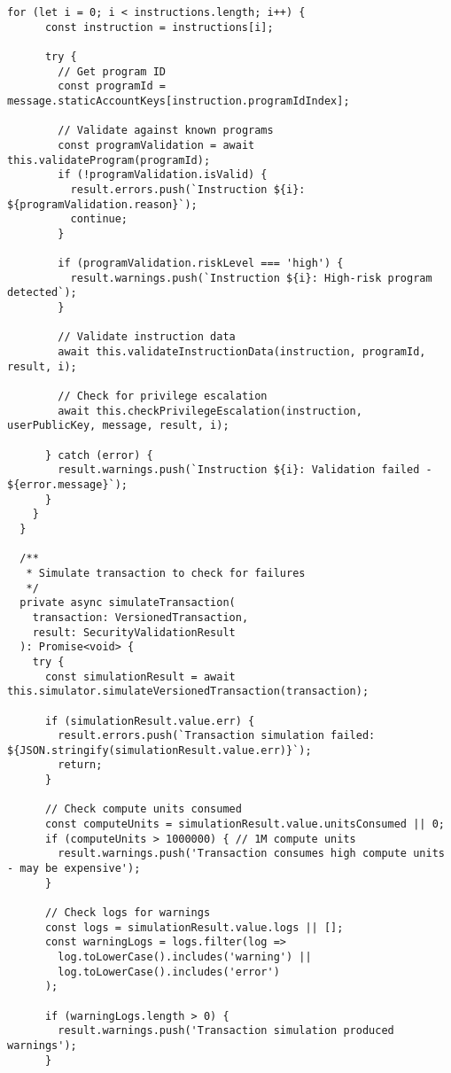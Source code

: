 \documentclass[11pt,a4paper]{article}
\begin{document}
\begin{lstlisting}[style=typescript, caption=Comprehensive Transaction Security]
    for (let i = 0; i < instructions.length; i++) {
      const instruction = instructions[i];
      
      try {
        // Get program ID
        const programId = message.staticAccountKeys[instruction.programIdIndex];
        
        // Validate against known programs
        const programValidation = await this.validateProgram(programId);
        if (!programValidation.isValid) {
          result.errors.push(`Instruction ${i}: ${programValidation.reason}`);
          continue;
        }

        if (programValidation.riskLevel === 'high') {
          result.warnings.push(`Instruction ${i}: High-risk program detected`);
        }

        // Validate instruction data
        await this.validateInstructionData(instruction, programId, result, i);

        // Check for privilege escalation
        await this.checkPrivilegeEscalation(instruction, userPublicKey, message, result, i);

      } catch (error) {
        result.warnings.push(`Instruction ${i}: Validation failed - ${error.message}`);
      }
    }
  }

  /**
   * Simulate transaction to check for failures
   */
  private async simulateTransaction(
    transaction: VersionedTransaction,
    result: SecurityValidationResult
  ): Promise<void> {
    try {
      const simulationResult = await this.simulator.simulateVersionedTransaction(transaction);

      if (simulationResult.value.err) {
        result.errors.push(`Transaction simulation failed: ${JSON.stringify(simulationResult.value.err)}`);
        return;
      }

      // Check compute units consumed
      const computeUnits = simulationResult.value.unitsConsumed || 0;
      if (computeUnits > 1000000) { // 1M compute units
        result.warnings.push('Transaction consumes high compute units - may be expensive');
      }

      // Check logs for warnings
      const logs = simulationResult.value.logs || [];
      const warningLogs = logs.filter(log => 
        log.toLowerCase().includes('warning') || 
        log.toLowerCase().includes('error')
      );

      if (warningLogs.length > 0) {
        result.warnings.push('Transaction simulation produced warnings');
      }


\end{lstlisting}
\end{document}
